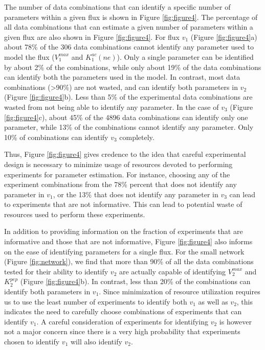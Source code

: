 \documentclass[10pt]{article}
\begin{document}
	The number of data combinations that can identify a specific number of parameters within a given flux is shown in Figure \ref{fig:figure4}. The percentage of all data combinations that can estimate a given number of parameters within a given flux are also shown in Figure \ref{fig:figure4}. For flux $v_1$ (Figure \ref{fig:figure4}a) about 78\% of the 306 data combinations cannot identify any parameter used to model the flux ($V_1^{max}$ and $K_1^{ac}(ne)$). Only a single parameter can be identified by about 2\% of the combinations, while only about 19\% of the data combinations can identify both the parameters used in the model. 	
	In contrast, most data combinations (>90\%) are not wasted, and can identify both parameters in $v_2$ (Figure \ref{fig:figure4}b). Less than 5\% of the experimental data combinations are wasted from not being able to identify any parameter. In the case of $v_3$ (Figure \ref{fig:figure4}c), about 45\% of the 4896 data combinations can identify only one parameter, while 13\% of the combinations cannot identify any parameter. Only 10\% of combinations can identify $v_3$ completely. 
	
	Thus, Figure \ref{fig:figure4} gives credence to the idea that careful experimental design is necessary to minimize usage of resources devoted to performing experiments for parameter estimation. For instance, choosing any of the experiment combinations from the 78\% percent that does not identify any parameter in $v_1$, or the 13\% that does not identify any parameter in $v_3$ can lead to experiments that are not informative. This can lead to potential waste of resources used to perform these experiments.	 
	
	In addition to providing information on the fraction of experiments that are informative and those that are not informative, Figure \ref{fig:figure4} also informs on the ease of identifying parameters for a single flux. For the small network (Figure \ref{fig:network}), we find that more than 90\% of all the data combinations tested for their ability to identify $v_2$ are actually capable of identifying $V_2^{max}$ and $K_2^{pep}$ (Figure \ref{fig:figure4}b). In contrast, less than 20\% of the combinations can identify both parameters in $v_1$. Since minimization of resource utilization requires us to use the least number of experiments to identify both $v_1$ as well as $v_2$, this indicates the need to carefully choose combinations of experiments that can identify $v_1$. A careful consideration of experiments for identifying $v_2$ is however not a major concern since there is a very high probability that experiments chosen to identify $v_1$ will also identify $v_2$. 	
	
\end{document}
